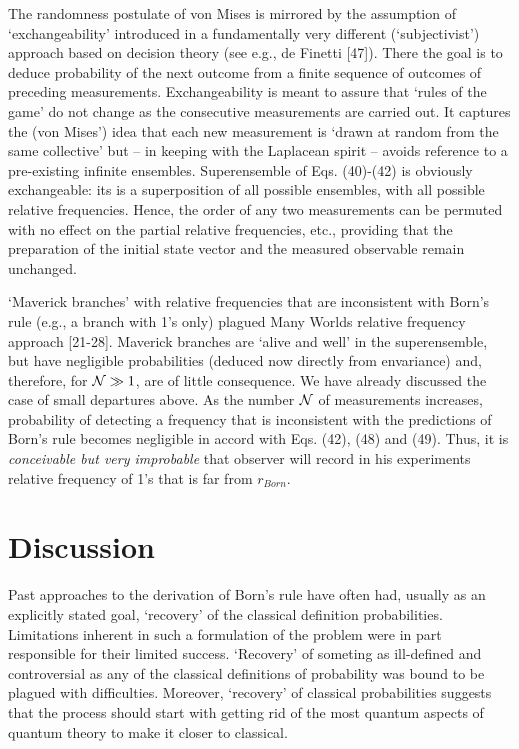 \documentclass[aps,pra,epsfig,11pt,floatfix]{revtex4}
\begin{document}
The randomness postulate of von Mises is mirrored by the assumption of
`exchangeability' introduced in a fundamentally very different (`subjectivist')
approach based on decision theory (see e.g., de Finetti [47]). There the goal
is to deduce probability of the next outcome from a finite sequence of
outcomes of preceding measurements. Exchangeability is meant to assure that
`rules of the game' do not change as the consecutive measurements are carried
out. It captures the (von Mises') idea that each new measurement is `drawn
at random from the same collective' but -- in keeping with the Laplacean
spirit -- avoids reference to a pre-existing infinite ensembles.
Superensemble of Eqs. (40)-(42) is obviously exchangeable:  its is 
a superposition of all possible ensembles, with all possible relative
frequencies. Hence, the order of any two measurements can be permuted 
with no effect on the partial relative frequencies, etc., providing that 
the preparation of the initial state vector and the measured observable 
remain unchanged. 

`Maverick branches' with relative frequencies that are inconsistent with Born's
rule (e.g., a branch with 1's only) plagued Many Worlds relative frequency
approach [21-28]. Maverick branches are `alive and well' in the superensemble,
but have negligible probabilities (deduced now directly from envariance) and,
therefore, for ${\cal N} \gg 1$, are of little consequence.  We have
already discussed the case of small departures above. As the number
${\cal N}$ of measurements increases, probability of detecting a frequency
that is inconsistent with the predictions of Born's rule becomes negligible
in accord with Eqs. (42), (48) and (49). Thus, it is {\it conceivable but very improbable} 
that observer will record in his experiments relative frequency of 1's that is 
far from $r_{Born}$.

\section{Discussion}

Past approaches to the derivation of Born's rule have often had, 
usually as an explicitly stated  goal,  `recovery'  of the classical 
definition probabilities. Limitations inherent in such
a formulation of the problem were in part responsible for their
limited success. `Recovery' of someting as ill-defined and controversial
as any of the classical definitions of probability was bound to be
plagued with difficulties. Moreover, `recovery' of classical probabilities 
suggests that the process should start with getting rid of the most 
quantum aspects of quantum theory to make it closer to classical. 
\end{document}
